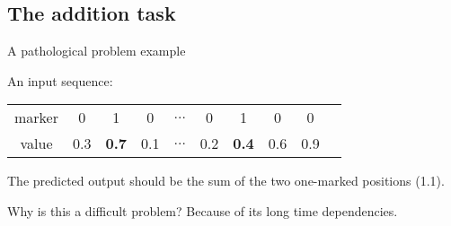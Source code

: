 \subsection{The addition task}
\begin{frame}{A pathological problem example}


An input sequence:

\vspace{1em}

\begin{tabular}{|c|c|c|c|c|c|c|c|c|c}
	\hline  marker & 0&  1&  0&  $\hdots$& 0 & 1 & 0 & 0  \\ 
	  value & 0.3&  \textbf{0.7}&  0.1&  $\hdots$& 0.2& \textbf{0.4} & 0.6& 0.9  \\ 
	\hline 
\end{tabular}

\vspace{1em}
The predicted output should be the sum of the two one-marked positions (1.1). 
\pause
\vspace{1em}
\begin{block}{Why is this a difficult problem?}
	Because of its long time dependencies.
\end{block}

\end{frame}
